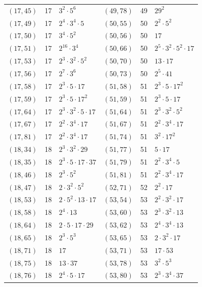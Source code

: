 \documentclass[11pt]{article}
\begin{document}
\begin{longtable}{@{}lrl@{\qquad}lrl@{}}
$(17,45)$ & 17 & $3^{2}\cdot 5^{6}$ & $(49,78)$ & 49 & $29^{2}$\\
$(17,49)$ & 17 & $2^{4}\cdot 3^{4}\cdot 5$ & $(50,55)$ & 50 & $2^{2}\cdot 5^{2}$\\
$(17,50)$ & 17 & $3^{4}\cdot 5^{2}$ & $(50,56)$ & 50 & $17$\\
$(17,51)$ & 17 & $2^{16}\cdot 3^{4}$ & $(50,66)$ & 50 & $2^{5}\cdot 3^{2}\cdot 5^{2}\cdot 17$\\
$(17,53)$ & 17 & $2^{3}\cdot 3^{2}\cdot 5^{2}$ & $(50,70)$ & 50 & $13\cdot 17$\\
$(17,56)$ & 17 & $2^{7}\cdot 3^{6}$ & $(50,73)$ & 50 & $2^{5}\cdot 41$\\
$(17,58)$ & 17 & $2^{3}\cdot 5\cdot 17$ & $(51,58)$ & 51 & $2^{3}\cdot 5\cdot 17^{2}$\\
$(17,59)$ & 17 & $2^{3}\cdot 5\cdot 17^{2}$ & $(51,59)$ & 51 & $2^{3}\cdot 5\cdot 17$\\
$(17,64)$ & 17 & $2^{3}\cdot 3^{2}\cdot 5\cdot 17$ & $(51,64)$ & 51 & $2^{3}\cdot 3^{2}\cdot 5^{2}$\\
$(17,67)$ & 17 & $2^{2}\cdot 3^{4}\cdot 17$ & $(51,67)$ & 51 & $2^{2}\cdot 3^{4}\cdot 17$\\
$(17,81)$ & 17 & $2^{2}\cdot 3^{4}\cdot 17$ & $(51,74)$ & 51 & $3^{2}\cdot 17^{2}$\\
$(18,34)$ & 18 & $2^{3}\cdot 3^{2}\cdot 29$ & $(51,77)$ & 51 & $5\cdot 17$\\
$(18,35)$ & 18 & $2^{3}\cdot 5\cdot 17\cdot 37$ & $(51,79)$ & 51 & $2^{2}\cdot 3^{4}\cdot 5$\\
$(18,46)$ & 18 & $2^{3}\cdot 5^{2}$ & $(51,81)$ & 51 & $2^{2}\cdot 3^{4}\cdot 17$\\
$(18,47)$ & 18 & $2\cdot 3^{2}\cdot 5^{2}$ & $(52,71)$ & 52 & $2^{2}\cdot 17$\\
$(18,53)$ & 18 & $2\cdot 5^{2}\cdot 13\cdot 17$ & $(53,54)$ & 53 & $2^{2}\cdot 3^{2}\cdot 17$\\
$(18,58)$ & 18 & $2^{4}\cdot 13$ & $(53,60)$ & 53 & $2^{3}\cdot 3^{2}\cdot 13$\\
$(18,64)$ & 18 & $2\cdot 5\cdot 17\cdot 29$ & $(53,62)$ & 53 & $2^{4}\cdot 3^{4}\cdot 13$\\
$(18,65)$ & 18 & $2^{3}\cdot 5^{3}$ & $(53,65)$ & 53 & $2\cdot 3^{2}\cdot 17$\\
$(18,71)$ & 18 & $17$ & $(53,71)$ & 53 & $17\cdot 53$\\
$(18,75)$ & 18 & $13\cdot 37$ & $(53,78)$ & 53 & $3^{2}\cdot 5^{3}$\\
$(18,76)$ & 18 & $2^{4}\cdot 5\cdot 17$ & $(53,80)$ & 53 & $2^{3}\cdot 3^{4}\cdot 37$\\

\end{longtable}
\end{document}
